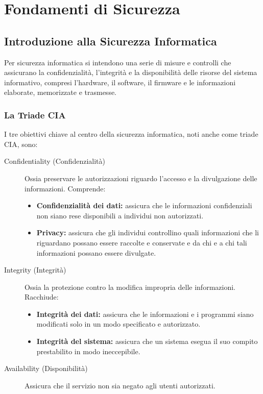 \chapter{Fondamenti di Sicurezza}

\section{Introduzione alla Sicurezza Informatica}

Per sicurezza informatica si intendono una serie di misure e controlli che assicurano la confidenzialità, l'integrità e la disponibilità delle risorse del sistema informativo, compresi l'hardware, il software, il firmware e le informazioni elaborate, memorizzate e trasmesse.

\subsection{La Triade CIA}

I tre obiettivi chiave al centro della sicurezza informatica, noti anche come triade CIA, sono:

\begin{description}
    \item[Confidentiality (Confidenzialità)] Ossia preservare le autorizzazioni riguardo l'accesso e la divulgazione delle informazioni. Comprende:
    \begin{itemize}
        \item \textbf{Confidenzialità dei dati:} assicura che le informazioni confidenziali non siano rese disponibili a individui non autorizzati.
        \item \textbf{Privacy:} assicura che gli individui controllino quali informazioni che li riguardano possano essere raccolte e conservate e da chi e a chi tali informazioni possano essere divulgate.
    \end{itemize}
    
    \item[Integrity (Integrità)] Ossia la protezione contro la modifica impropria delle informazioni. Racchiude:
    \begin{itemize}
        \item \textbf{Integrità dei dati:} assicura che le informazioni e i programmi siano modificati solo in un modo specificato e autorizzato.
        \item \textbf{Integrità del sistema:} assicura che un sistema esegua il suo compito prestabilito in modo ineccepibile.
    \end{itemize}
    
    \item[Availability (Disponibilità)] Assicura che il servizio non sia negato agli utenti autorizzati.
\end{description}

